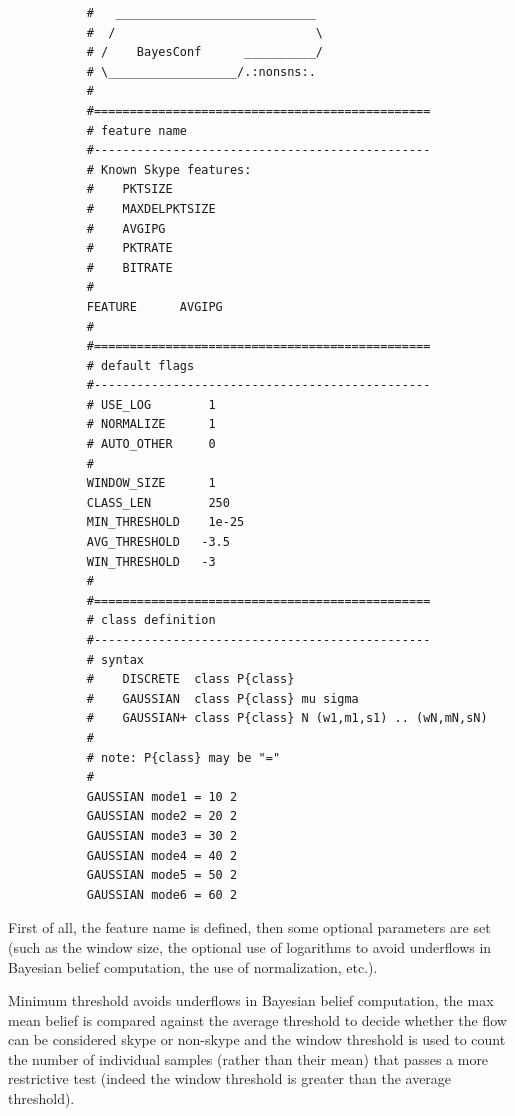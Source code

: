 \documentclass[11pt]{article}
\begin{document}
\begin{small}\begin{verbatim}
           #   ____________________________  
           #  /                            \ 
           # /    BayesConf      __________/ 
           # \__________________/.:nonsns:.  
           #                              
           #===============================================
           # feature name
           #-----------------------------------------------
           # Known Skype features:
           #    PKTSIZE 
           #    MAXDELPKTSIZE  
           #    AVGIPG  
           #    PKTRATE  
           #    BITRATE  
           #
           FEATURE      AVGIPG
           #
           #===============================================
           # default flags 
           #-----------------------------------------------
           # USE_LOG        1
           # NORMALIZE      1
           # AUTO_OTHER     0
           #
           WINDOW_SIZE      1
           CLASS_LEN        250
           MIN_THRESHOLD    1e-25
           AVG_THRESHOLD   -3.5
           WIN_THRESHOLD   -3
           #
           #===============================================
           # class definition
           #-----------------------------------------------
           # syntax
           #    DISCRETE  class P{class}
           #    GAUSSIAN  class P{class} mu sigma
           #    GAUSSIAN+ class P{class} N (w1,m1,s1) .. (wN,mN,sN)
           #
           # note: P{class} may be "="
           #
           GAUSSIAN mode1 = 10 2
           GAUSSIAN mode2 = 20 2
           GAUSSIAN mode3 = 30 2
           GAUSSIAN mode4 = 40 2
           GAUSSIAN mode5 = 50 2
           GAUSSIAN mode6 = 60 2
\end{verbatim}\end{small} \noindent
First of all, the feature name is defined, then some optional parameters are set
(such as the window size, the optional use of logarithms to avoid underflows in 
Bayesian belief computation, the use of normalization, etc.).



Minimum threshold avoids underflows in Bayesian belief computation,
the max mean belief is compared against the average threshold to decide
whether the flow can be considered skype or non-skype and the window
threshold is used to count the number of individual samples (rather than
their mean) that passes a more restrictive test (indeed the window threshold
is greater than the average threshold).
\end{document}
